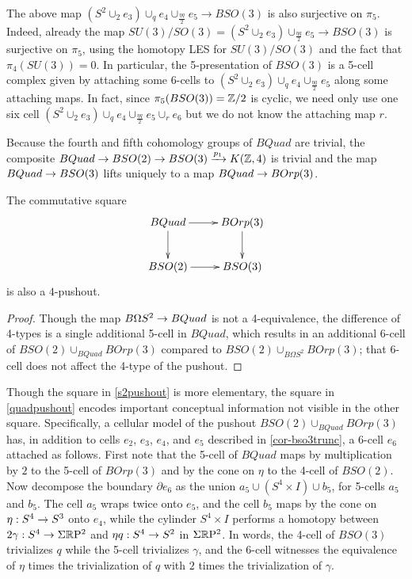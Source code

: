 \documentclass{amsart}
\begin{document}
\begin{remark} 
\label{rem:pi5surj}
The above map $(S^2 \cup_2 e_3) \cup_q e_4 \cup_{\frac{\eta q}{2}} e_5 \rightarrow BSO(3)$ is also surjective on $\pi_5$. Indeed, already the map $SU(3)/SO(3) = (S^2 \cup_2 e_3) \cup_{\frac{\eta q}{2}} e_5 \rightarrow BSO(3)$ is surjective on $\pi_5$, using the homotopy LES for $SU(3)/SO(3)$ and the fact that $\pi_4(SU(3))=0$. In particular, the 5-presentation of $BSO(3)$ is a 5-cell complex given by attaching some $6$-cells to $(S^2 \cup_2 e_3) \cup_q e_4 \cup_{\frac{\eta q}{2}} e_5$ along some attaching maps. In fact, since $\pi_5(BSO(3)) = \mathbb Z/2$ is cyclic, we need only use one six cell $(S^2 \cup_2 e_3) \cup_q e_4 \cup_{\frac{\eta q}{2}} e_5 \cup_r e_6$ but we do not know the attaching map $r$.
\end{remark}

Because the fourth and fifth cohomology groups of $BQuad$ are trivial, the composite $BQuad \rightarrow BSO(2) \rightarrow BSO(3) \xrightarrow{p_1} K(\mathbb Z,4)$ is trivial and the map $BQuad \rightarrow BSO(3)$ lifts uniquely to a map $BQuad \rightarrow BOrp(3)$.

\begin{corollary}
\label{quadpushout}
The commutative square
\[
\vcenter{\hbox{\xymatrix{
BQuad \ar[r] \ar[d] & BOrp(3) \ar[d] \\
BSO(2) \ar[r] & BSO(3)
}}}
\]
is also a $4$-pushout.
\end{corollary}
\begin{proof}
Though the map $B\Omega S^2 \rightarrow BQuad$ is not a 4-equivalence, the difference of 4-types is a single additional 5-cell in $BQuad$, which results in an additional 6-cell of $BSO(2) \cup_{BQuad} BOrp(3)$ compared to $BSO(2) \cup_{B\Omega S^2} BOrp(3)$; that 6-cell does not affect the 4-type of the pushout.
\end{proof}

\nid Though the square in \cref{s2pushout} is more elementary, the square in \cref{quadpushout} encodes important conceptual information not visible in the other square.  Specifically, a cellular model of the pushout $BSO(2) \cup_{BQuad} BOrp(3)$ has, in addition to cells $e_2$, $e_3$, $e_4$, and $e_5$ described in \cref{cor-bso3trunc}, a 6-cell $e_6$ attached as follows.  First note that the 5-cell of $BQuad$ maps by multiplication by $2$ to the 5-cell of $BOrp(3)$ and by the cone on $\eta$ to the 4-cell of $BSO(2)$.  %
Now decompose the boundary $\partial e_6$ as the union $a_5 \cup (S^4 \times I) \cup b_5$, for 5-cells $a_5$ and $b_5$.  The cell $a_5$ wraps twice onto $e_5$, and the cell $b_5$ maps by the cone on $\eta: S^4 \rightarrow S^3$ onto $e_4$, while the cylinder $S^4 \times I$ performs a homotopy between $2 \gamma : S^4 \rightarrow \Sigma \mathbb R \mathrm{P}^2$ and $\eta q: S^4 \rightarrow S^2$ in $\Sigma \mathbb R \mathrm{P}^2$.  In words, the 4-cell of $BSO(3)$ trivializes $q$ while the 5-cell trivializes $\gamma$, and the 6-cell witnesses the equivalence of $\eta$ times the trivialization of $q$ with $2$ times the trivialization of $\gamma$.
\end{document}
